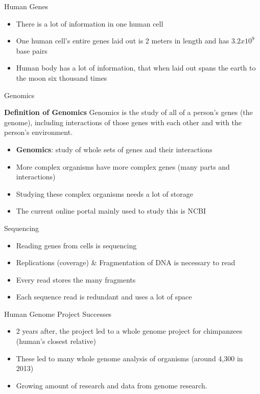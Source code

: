 \documentclass{beamer}
\begin{document}
\begin{frame}{Human Genes}
  \begin{itemize}   
    \item There is a lot of information in one human cell
    \item One human cell's entire genes laid out is 2 meters in length \cite{ency_sci_tech} and has $3.2x10^9$ base pairs \cite{introgenomics}
    \item Human body has a lot of information, that when laid out spans the earth to the moon six thousand times
\end{itemize}
\end{frame}


\begin{frame}{Genomics}
  \begin{block} {\textbf{Definition of Genomics}}
    Genomics is the study of all of a person's genes (the genome), including interactions of those genes with each other and with the person's environment. \cite{genomics-definition}
  \end{block}
  \begin{itemize}   
    \item \textbf{Genomics}: study of whole sets of genes and their interactions \cite{campbell}
    \item More complex organisms have more complex genes (many parts and interactions)
    \item Studying these complex organisms needs a lot of storage
    \item The current online portal mainly used to study this is NCBI \cite{campbell}
  \end{itemize}
\end{frame}

\begin{frame}{Sequencing}
  \begin{itemize}   
    \item Reading genes from cells is sequencing
    \item Replications (coverage) \& Fragmentation of DNA is necessary to read
    \item Every read stores the many fragments
    \item Each sequence read is redundant and uses a lot of space
  \end{itemize}
\end{frame}

\begin{frame}{Human Genome Project Successes}
  \begin{itemize}   
    \item 2 years after, the project led to a whole genome project for chimpanzees (human's closest relative) \cite{campbell}
    \item These led to many whole genome analysis of organisms (around 4,300 in 2013) \cite{campbell}
    \item Growing amount of research and data from genome research.
  \end{itemize}
\end{frame}
\end{document}
